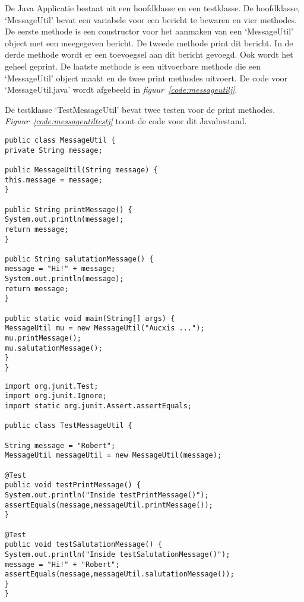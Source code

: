 De Java Applicatie bestaat uit een hoofdklasse en een testklasse. De hoofdklasse, ‘MessageUtil’ bevat een variabele voor een bericht te bewaren en vier methodes. De eerste methode is een constructor voor het aanmaken van een ‘MessageUtil’ object met een meegegeven bericht. De tweede methode print dit bericht. In de derde methode wordt er een toevoegsel aan dit bericht gevoegd. Ook wordt het geheel geprint. De laatste methode is een uitvoerbare methode die een ‘MessageUtil’ object maakt en de twee print methodes uitvoert. De code voor ‘MessageUtil.java’ wordt afgebeeld in \emph{figuur~\ref{code:messageutilj}}. 

De testklasse ‘TestMessageUtil’ bevat twee testen voor de print methodes. \emph{Figuur~\ref{code:messageutiltestj}}  toont de code voor dit Javabestand.

\begin{lstlisting}
public class MessageUtil {
private String message;

public MessageUtil(String message) {
this.message = message;
}

public String printMessage() {
System.out.println(message);
return message;
}

public String salutationMessage() {
message = "Hi!" + message;
System.out.println(message);
return message;
}

public static void main(String[] args) {
MessageUtil mu = new MessageUtil("Aucxis ...");
mu.printMessage();
mu.salutationMessage();
}
}
\end{lstlisting}

\begin{lstlisting}
import org.junit.Test;
import org.junit.Ignore;
import static org.junit.Assert.assertEquals;

public class TestMessageUtil {

String message = "Robert";    
MessageUtil messageUtil = new MessageUtil(message);

@Test
public void testPrintMessage() {      
System.out.println("Inside testPrintMessage()");     
assertEquals(message,messageUtil.printMessage());
}

@Test
public void testSalutationMessage() {
System.out.println("Inside testSalutationMessage()");
message = "Hi!" + "Robert";
assertEquals(message,messageUtil.salutationMessage());
}
}
\end{lstlisting}

